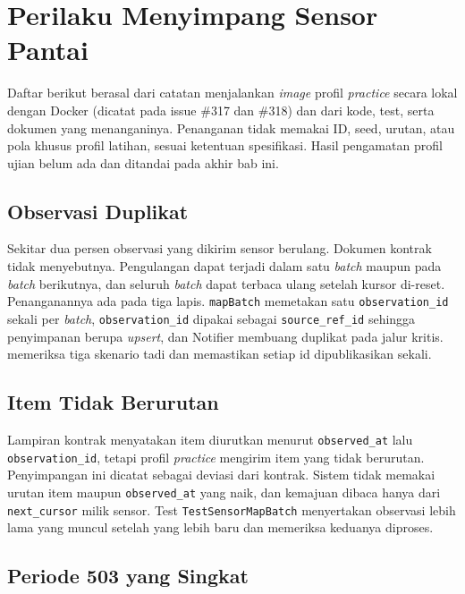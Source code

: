 \section{Perilaku Menyimpang Sensor Pantai}

Daftar berikut berasal dari catatan menjalankan \textit{image} profil \textit{practice} secara lokal dengan Docker (dicatat pada issue \#317 dan \#318) dan dari kode, test, serta dokumen yang menanganinya. Penanganan tidak memakai ID, seed, urutan, atau pola khusus profil latihan, sesuai ketentuan spesifikasi. Hasil pengamatan profil ujian belum ada dan ditandai pada akhir bab ini.

\subsection{Observasi Duplikat}

Sekitar dua persen observasi yang dikirim sensor berulang. Dokumen kontrak tidak menyebutnya. Pengulangan dapat terjadi dalam satu \textit{batch} maupun pada \textit{batch} berikutnya, dan seluruh \textit{batch} dapat terbaca ulang setelah kursor di-reset. Penanganannya ada pada tiga lapis. \texttt{mapBatch} memetakan satu \texttt{observation\_id} sekali per \textit{batch}, \texttt{observation\_id} dipakai sebagai \texttt{source\_ref\_id} sehingga penyimpanan berupa \textit{upsert}, dan Notifier membuang duplikat pada jalur kritis.  memeriksa tiga skenario tadi dan memastikan setiap id dipublikasikan sekali.

\subsection{Item Tidak Berurutan}

Lampiran kontrak menyatakan item diurutkan menurut \texttt{observed\_at} lalu \texttt{observation\_id}, tetapi profil \textit{practice} mengirim item yang tidak berurutan. Penyimpangan ini dicatat sebagai deviasi dari kontrak. Sistem tidak memakai urutan item maupun \texttt{observed\_at} yang naik, dan kemajuan dibaca hanya dari \texttt{next\_cursor} milik sensor. Test \texttt{TestSensorMapBatch} menyertakan observasi lebih lama yang muncul setelah yang lebih baru dan memeriksa keduanya diproses.

\subsection{Periode 503 yang Singkat}

